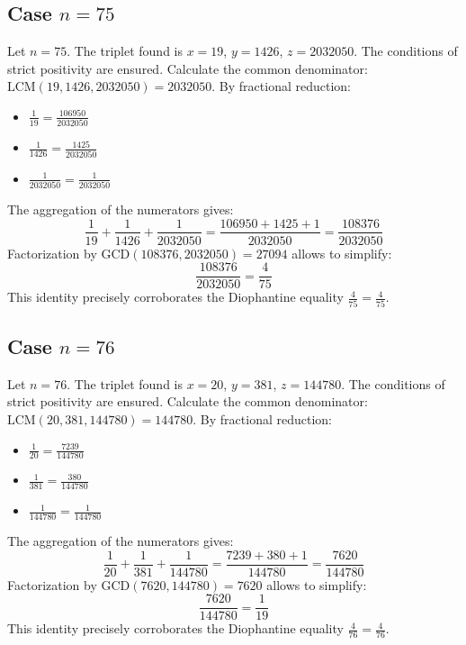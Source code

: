 \documentclass[11pt,a4paper]{article}
\begin{document}
\subsection{Case $n = 75$}
Let $n = 75$. The triplet found is $x = 19$, $y = 1426$, $z = 2032050$.
The conditions of strict positivity are ensured.
Calculate the common denominator: $\text{LCM}(19, 1426, 2032050) = 2032050$.
By fractional reduction:
\begin{itemize}
    \item $\frac{1}{19} = \frac{106950}{2032050}$
    \item $\frac{1}{1426} = \frac{1425}{2032050}$
    \item $\frac{1}{2032050} = \frac{1}{2032050}$
\end{itemize}
The aggregation of the numerators gives:
$$ \frac{1}{19} + \frac{1}{1426} + \frac{1}{2032050} = \frac{106950 + 1425 + 1}{2032050} = \frac{108376}{2032050} $$
Factorization by $\text{GCD}(108376, 2032050) = 27094$ allows to simplify:
$$ \frac{108376}{2032050} = \frac{4}{75} $$
This identity precisely corroborates the Diophantine equality $\frac{4}{75} = \frac{4}{75}$.

\subsection{Case $n = 76$}
Let $n = 76$. The triplet found is $x = 20$, $y = 381$, $z = 144780$.
The conditions of strict positivity are ensured.
Calculate the common denominator: $\text{LCM}(20, 381, 144780) = 144780$.
By fractional reduction:
\begin{itemize}
    \item $\frac{1}{20} = \frac{7239}{144780}$
    \item $\frac{1}{381} = \frac{380}{144780}$
    \item $\frac{1}{144780} = \frac{1}{144780}$
\end{itemize}
The aggregation of the numerators gives:
$$ \frac{1}{20} + \frac{1}{381} + \frac{1}{144780} = \frac{7239 + 380 + 1}{144780} = \frac{7620}{144780} $$
Factorization by $\text{GCD}(7620, 144780) = 7620$ allows to simplify:
$$ \frac{7620}{144780} = \frac{1}{19} $$
This identity precisely corroborates the Diophantine equality $\frac{4}{76} = \frac{4}{76}$.
\end{document}
